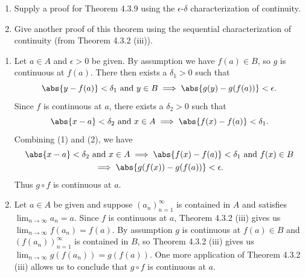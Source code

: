 \documentclass{lew98_solutions}
\begin{document}
\begin{exercise}
\label{ex:4.3.3}
    \begin{enumerate}
        \item Supply a proof for Theorem 4.3.9 using the \( \epsilon \)-\( \delta \) characterization of continuity.

        \item Give another proof of this theorem using the sequential characterization of continuity (from Theorem 4.3.2 (iii)).
    \end{enumerate}
\end{exercise}

\begin{solution}
    \begin{enumerate}
        \item Let \( a \in A \) and \( \epsilon > 0 \) be given. By assumption we have \( f(a) \in B \), so \( g \) is continuous at \( f(a) \). There then exists a \( \delta_1 > 0 \) such that
        \begin{equation}
            \abs{y - f(a)} < \delta_1 \text{ and } y \in B \implies \abs{g(y) - g(f(a))} < \epsilon.
        \end{equation}
        Since \( f \) is continuous at \( a \), there exists a \( \delta_2 > 0 \) such that
        \begin{equation}
            \abs{x - a} < \delta_2 \text{ and } x \in A \implies \abs{f(x) - f(a)} < \delta_1.
        \end{equation}
        Combining (1) and (2), we have
        \begin{multline*}
            \abs{x - a} < \delta_2 \text{ and } x \in A \implies \abs{f(x) - f(a)} < \delta_1 \text{ and } f(x) \in B \\ \implies \abs{g(f(x)) - g(f(a))} < \epsilon.
        \end{multline*}
        Thus \( g \circ f \) is continuous at \( a \).

        \item Let \( a \in A \) be given and suppose \( (a_n)_{n=1}^{\infty} \) is contained in \( A \) and satisfies \( \lim_{n \to \infty} a_n = a \). Since \( f \) is continuous at \( a \), Theorem 4.3.2 (iii) gives us \( \lim_{n \to \infty} f(a_n) = f(a) \). By assumption \( g \) is continuous at \( f(a) \in B \) and \( (f(a_n))_{n=1}^{\infty} \) is contained in \( B \), so Theorem 4.3.2 (iii) gives us \( \lim_{n \to \infty} g(f(a_n)) = g(f(a)) \). One more application of Theorem 4.3.2 (iii) allows us to conclude that \( g \circ f \) is continuous at \( a \).
    \end{enumerate}
\end{solution}
\end{document}
